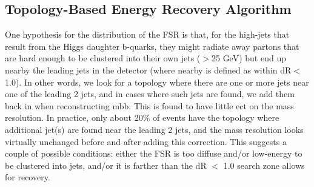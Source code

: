 \subsection{Topology-Based Energy Recovery Algorithm}
 One hypothesis for the distribution of the FSR is that, for the high-\pt jets that result from the Higgs
 daughter b-quarks, they might radiate away partons that are hard enough to be clustered into their own
 jets (\pt$>$25 GeV) but end up nearby the leading jets in the detector (where nearby is defined as within
 dR$<$1.0). In other words, we look for a topology where there are one or more jets near one of the leading
2 jets, and in cases where such jets are found, we add them back in when reconstructing mbb.
 This is found to have little ect on the mass resolution. In practice, only about 20\% of events
 have the topology where additional jet(s) are found near the leading 2 jets, and the mass resolution
 looks virtually unchanged before and after adding this correction. This suggests a couple of possible
 conditions: either the FSR is too diffuse and/or low-energy to be clustered into jets, and/or it is farther
 than the dR $<$ 1.0 search zone allows for recovery. 
    
